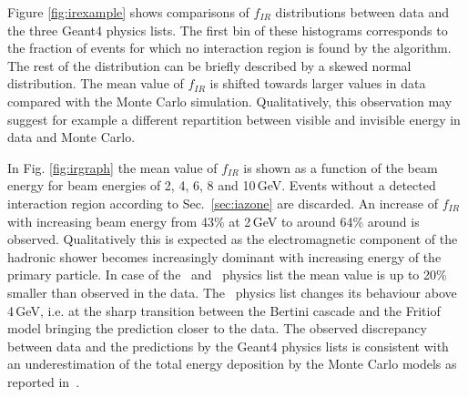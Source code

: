 
Figure \ref{fig:irexample} shows comparisons of $f_{IR}$ distributions between data and the three {\sc Geant4} physics lists.
The first bin of these histograms corresponds to the fraction of events for which no interaction region is found by the algorithm.
The rest of the distribution can be briefly described by a skewed normal distribution. The mean value of $f_{IR}$ is shifted towards larger values in data compared with the Monte Carlo simulation. Qualitatively, this observation may suggest for example a different repartition between visible and invisible energy in data and Monte Carlo.

In Fig. \ref{fig:irgraph} the mean value of $f_{IR}$ is shown as a function of the beam energy  for beam energies of 2, 4, 6, 8 and 10\,GeV. Events without a detected interaction region according to Sec.~\ref{sec:iazone} are discarded. An increase of $f_{IR}$ with increasing beam energy from 43\% at 2\,GeV to around 64\% around is observed. Qualitatively this is expected as the electromagnetic component of the hadronic shower becomes increasingly dominant with increasing energy of the primary particle.
In case of the \qgsp\ and \qbbc\  physics list the mean value is up to 20\% smaller than observed in the data.  The \ftfp\ physics list changes its behaviour above 4\,GeV, i.e. at the sharp transition between the Bertini cascade and the Fritiof model bringing the prediction closer to the data.  
The observed discrepancy between data and the predictions by the {\sc Geant4} physics lists is consistent with an underestimation of the total energy deposition by the Monte Carlo models as reported in~\cite{Bilki:2014uep}.


